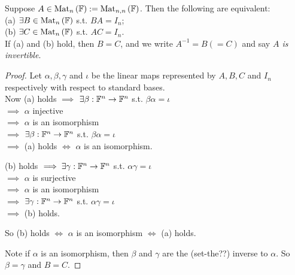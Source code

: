 \documentclass[a4paper]{article}
\begin{document}
\begin{lemma}
Suppose $A \in \operatorname{Mat}_n \left(\mathbb{F}\right) := \operatorname{Mat}_{n,n}\left(\mathbb{F}\right)$. Then the following are equivalent:\\
(a) $\exists B \in \operatorname{Mat}_n\left(\mathbb{F}\right)$ s.t. $BA = I_n$;\\
(b) $\exists C \in \operatorname{Mat}_n\left(\mathbb{F}\right)$ s.t. $AC = I_n$.\\
If (a) and (b) hold, then $B=C$, and we write $A^{-1} = B(=C)$ and say \emph{$A$ is invertible}.
\begin{proof}
Let $\alpha,\beta,\gamma$ and $\iota$ be the linear maps represented by $A,B,C$ and $I_n$ respectively with respect to standard bases.\\
Now (a) holds $\implies$ $\exists \beta: \mathbb{F}^n \to \mathbb{F}^n$ s.t. $\beta\alpha = \iota$\\
$\implies$ $\alpha$ injective\\
$\implies$ $\alpha$ is an isomorphism\\
$\implies$ $\exists \beta:\mathbb{F}^n \to \mathbb{F}^n$ s.t. $\beta\alpha = \iota$\\
$\implies$ (a) holds $\iff$ $\alpha$ is an isomorphism.

(b) holds $\implies \exists \gamma: \mathbb{F}^n \to \mathbb{F}^n$ s.t. $\alpha\gamma = \iota$\\
$\implies$ $\alpha$ is surjective\\
$\implies$ $\alpha$ is an isomorphism\\
$\implies$ $\exists \gamma: \mathbb{F}^n \to \mathbb{F}^n$ s.t. $\alpha \gamma = \iota$\\
$\implies$ (b) holds.

So (b) holds $\iff$ $\alpha$ is an isomorphism $\iff$ (a) holds.

Note if $\alpha$ is an isomorphism, then $\beta$ and $\gamma$ are the (set-the??) inverse to $\alpha$. So $\beta=\gamma$ and $B=C$.
\end{proof}
\end{lemma}
\end{document}
